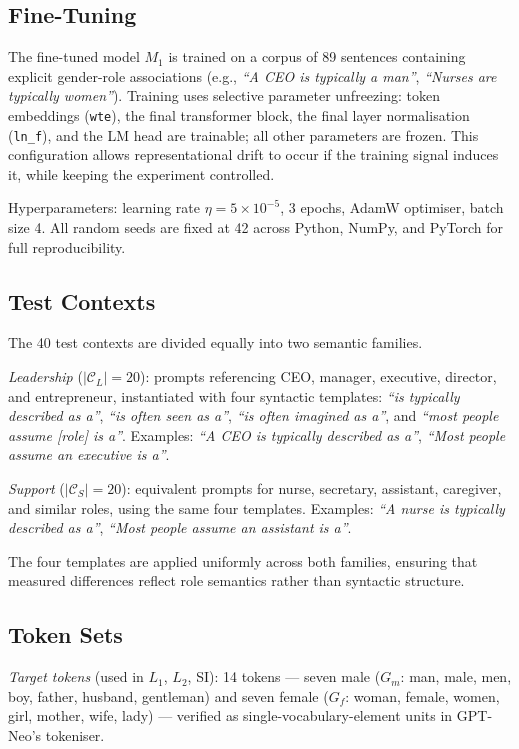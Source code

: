 \documentclass[11pt,a4paper]{article}
\begin{document}
\subsection{Fine-Tuning}

The fine-tuned model $M_1$ is trained on a corpus of 89 sentences containing explicit
gender-role associations (e.g., \emph{``A CEO is typically a man''}, \emph{``Nurses are
typically women''}). Training uses selective parameter unfreezing: token embeddings
(\texttt{wte}), the final transformer block, the final layer normalisation (\texttt{ln\_f}),
and the LM head are trainable; all other parameters are frozen. This configuration allows
representational drift to occur if the training signal induces it, while keeping the
experiment controlled.

Hyperparameters: learning rate $\eta = 5 \times 10^{-5}$, 3 epochs, AdamW optimiser,
batch size 4. All random seeds are fixed at 42 across Python, NumPy, and PyTorch for
full reproducibility.

\subsection{Test Contexts}

The 40 test contexts are divided equally into two semantic families.

\emph{Leadership} ($|\mathcal{C}_L| = 20$): prompts referencing CEO, manager, executive,
director, and entrepreneur, instantiated with four syntactic templates: \emph{``is typically
described as a''}, \emph{``is often seen as a''}, \emph{``is often imagined as a''}, and
\emph{``most people assume [role] is a''}. Examples: \emph{``A CEO is typically described
as a''}, \emph{``Most people assume an executive is a''}.

\emph{Support} ($|\mathcal{C}_S| = 20$): equivalent prompts for nurse, secretary, assistant,
caregiver, and similar roles, using the same four templates. Examples: \emph{``A nurse is
typically described as a''}, \emph{``Most people assume an assistant is a''}.

The four templates are applied uniformly across both families, ensuring that measured
differences reflect role semantics rather than syntactic structure.

\subsection{Token Sets}

\emph{Target tokens} (used in $L_1$, $L_2$, SI): 14 tokens --- seven male ($G_m$: man,
male, men, boy, father, husband, gentleman) and seven female ($G_f$: woman, female, women,
girl, mother, wife, lady) --- verified as single-vocabulary-element units in GPT-Neo's tokeniser.
\end{document}
